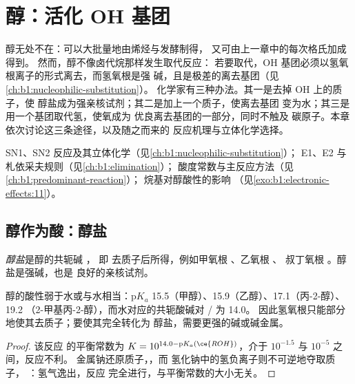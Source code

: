 \chapter{醇：活化 OH 基团}\label{ch:b1:alcohol-activation}

醇无处不在：可以大批量地由烯烃与发酵制得，
又可由上一章中的每次格氏加成得到。
然而，醇不像卤代烷那样发生取代反应：
若要取代，OH 基团必须以氢氧根离子的形式离去，而氢氧根是强
碱，且是极差的离去基团（见\cref{ch:b1:nucleophilic-substitution}）。
化学家有三种办法。其一是去掉 OH 上的质子，使
醇盐成为强亲核试剂；其二是加上一个质子，使离去基团
变为水；其三是用一个基团取代氢，使氧成为
优良离去基团的一部分，同时不触及
碳原子。本章依次讨论这三条途径，以及随之而来的
反应机理与立体化学选择。

\begin{recall}
SN1、SN2 反应及其立体化学（见\cref{ch:b1:nucleophilic-substitution}）；
E1、E2 与札依采夫规则（见\cref{ch:b1:elimination}）；
酸度常数与主反应方法（见\cref{ch:b1:predominant-reaction}）；
烷基对醇酸性的影响
（见\cref{exo:b1:electronic-effects:11}）。
\end{recall}

\section{醇作为酸：醇盐}

\begin{definition}[醇盐]\label{def:b1:alcohol-activation:alkoxide}
\emph{醇盐}是醇的共轭碱 ，
即  去质子后所得，例如甲氧根 、乙氧根 、
叔丁氧根 。醇盐是强碱，也是
良好的亲核试剂。
\end{definition}

\begin{proposition}[醇的酸性]\label{prop:b1:alcohol-activation:alcohol-acidity}
醇的酸性弱于水或与水相当：$\mathrm{p}K_a$
15.5（甲醇）、15.9（乙醇）、17.1（丙-2-醇）、19.2
（2-甲基丙-2-醇），而水对应的共轭酸碱对 / 为 14.0。
因此氢氧根只能部分地使其去质子；要使其完全转化为
醇盐，需要更强的碱或碱金属。
\end{proposition}

\begin{proof}
该反应  的平衡常数为 $K = 10^{14.0 -
\mathrm{p}K_a(\ce{ROH})}$，介于 $10^{-1.5}$ 与 $10^{-5}$ 之间，反应不利。
金属钠还原质子，，而
氢化钠中的氢负离子则不可逆地夺取质子，
：氢气逸出，反应
完全进行，与平衡常数的大小无关。
\end{proof}


